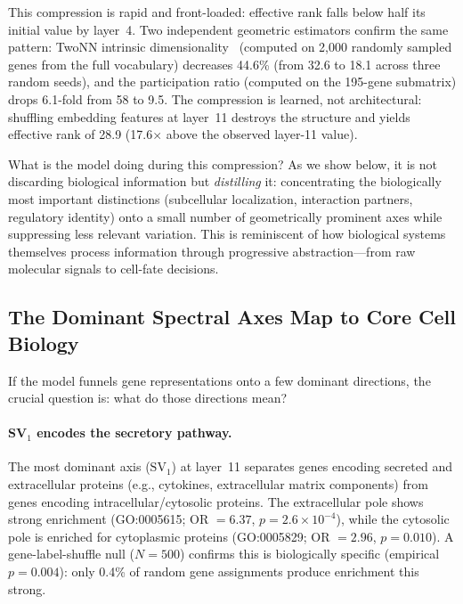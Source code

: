 \documentclass[10pt,twocolumn]{article}
\newcommand{\SV}[1]{\mathrm{SV}_{#1}}
\begin{document}
This compression is rapid and front-loaded: effective rank falls below half its initial value by layer~4.
Two independent geometric estimators confirm the same pattern: TwoNN intrinsic dimensionality~\citep{facco2017estimating} (computed on 2{,}000 randomly sampled genes from the full vocabulary) decreases 44.6\% (from 32.6 to 18.1 across three random seeds), and the participation ratio (computed on the 195-gene submatrix) drops 6.1-fold from 58 to 9.5.
The compression is learned, not architectural: shuffling embedding features at layer~11 destroys the structure and yields effective rank of 28.9 (17.6$\times$ above the observed layer-11 value).

What is the model doing during this compression?
As we show below, it is not discarding biological information but \emph{distilling} it: concentrating the biologically most important distinctions (subcellular localization, interaction partners, regulatory identity) onto a small number of geometrically prominent axes while suppressing less relevant variation.
This is reminiscent of how biological systems themselves process information through progressive abstraction---from raw molecular signals to cell-fate decisions.

\subsection{The Dominant Spectral Axes Map to Core Cell Biology}
\label{sec:bio_axes}

If the model funnels gene representations onto a few dominant directions, the crucial question is: what do those directions mean?

\paragraph{SV$_1$ encodes the secretory pathway.}
The most dominant axis ($\SV{1}$) at layer~11 separates genes encoding secreted and extracellular proteins (e.g., cytokines, extracellular matrix components) from genes encoding intracellular/cytosolic proteins.
The extracellular pole shows strong enrichment (GO:0005615; OR $= 6.37$, $p = 2.6 \times 10^{-4}$), while the cytosolic pole is enriched for cytoplasmic proteins (GO:0005829; OR $= 2.96$, $p = 0.010$).
A gene-label-shuffle null ($N = 500$) confirms this is biologically specific (empirical $p = 0.004$): only 0.4\% of random gene assignments produce enrichment this strong.
\end{document}
